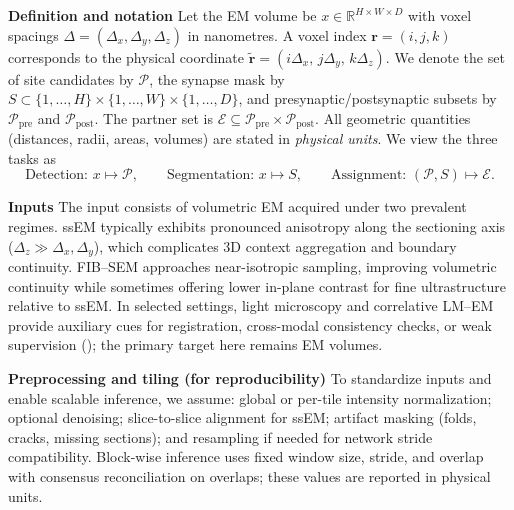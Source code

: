 \medskip
\noindent\textbf{Definition and notation}\;
Let the EM volume be \(x \in \mathbb{R}^{H \times W \times D}\) with voxel spacings \(\Delta=(\Delta_x,\Delta_y,\Delta_z)\) in nanometres.
A voxel index \(\mathbf r=(i,j,k)\) corresponds to the physical coordinate \(\tilde{\mathbf r}=(i\Delta_x,\,j\Delta_y,\,k\Delta_z)\).
We denote the set of site candidates by \(\mathcal P\), the synapse mask by \(S \subset \{1,\dots,H\}\times\{1,\dots,W\}\times\{1,\dots,D\}\), and presynaptic/postsynaptic subsets by \(\mathcal P_{\mathrm{pre}}\) and \(\mathcal P_{\mathrm{post}}\).
The partner set is \(\mathcal E \subseteq \mathcal P_{\mathrm{pre}}\times \mathcal P_{\mathrm{post}}\).
All geometric quantities (distances, radii, areas, volumes) are stated in \emph{physical units}.
We view the three tasks as
\[
\text{Detection: } x \mapsto \mathcal P,\qquad
\text{Segmentation: } x \mapsto S,\qquad
\text{Assignment: } (\mathcal P,S) \mapsto \mathcal E.
\]\par

\medskip
\noindent\textbf{Inputs}\;
The input consists of volumetric EM acquired under two prevalent regimes.
ssEM typically exhibits pronounced anisotropy along the sectioning axis (\(\Delta_z \gg \Delta_x,\Delta_y\)), which complicates 3D context aggregation and boundary continuity.
FIB--SEM approaches near-isotropic sampling, improving volumetric continuity while sometimes offering lower in-plane contrast for fine ultrastructure relative to ssEM.
In selected settings, light microscopy and correlative LM--EM provide auxiliary cues for registration, cross-modal consistency checks, or weak supervision (\cite{Simhal2017PCBiol}); the primary target here remains EM volumes.\par

\medskip
\noindent\textbf{Preprocessing and tiling (for reproducibility)}\;
To standardize inputs and enable scalable inference, we assume: global or per-tile intensity normalization; optional denoising; slice-to-slice alignment for ssEM; artifact masking (folds, cracks, missing sections); and resampling if needed for network stride compatibility.
Block-wise inference uses fixed window size, stride, and overlap with consensus reconciliation on overlaps; these values are reported in physical units.\par

